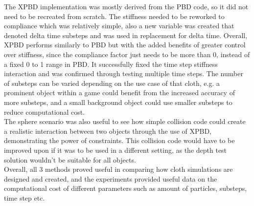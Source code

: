 \documentclass[12pt,a4paper]{article}
\begin{document}
The XPBD implementation was mostly derived from the PBD code, so it did not need to be recreated from scratch. The stiffness needed to be reworked to compliance which was relatively simple, also a new variable was created that denoted delta time substeps and was used in replacement for delta time. Overall, XPBD performs similarly to PBD but with the added benefits of greater control over stiffness, since the compliance factor just needs to be more than 0, instead of a fixed 0 to 1 range in PBD. It successfully fixed the time step stiffness interaction and was confirmed through testing multiple time steps. The number of substeps can be varied depending on the use case of that cloth, e.g. a prominent object within a game could benefit from the increased accuracy of more substeps, and a small background object could use smaller substeps to reduce computational cost. \\

The sphere scenario was also useful to see how simple collision code could create a realistic interaction between two objects through the use of XPBD, demonstrating the power of constraints. This collision code would have to be improved upon if it was to be used in a different setting, as the depth test solution wouldn't be suitable for all objects. \\

Overall, all 3 methods proved useful in comparing how cloth simulations are designed and created, and the experiments provided useful data on the computational cost of different parameters such as amount of particles, substeps, time step etc.
\end{document}
